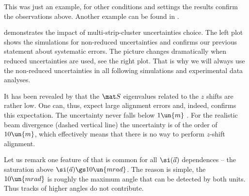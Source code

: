 This was just an example, for other conditions and settings the results confirm the observations above. Another example can be found in .


 demonstrates the impact of multi-strip-cluster uncertainties choice. The left plot shows the simulations for non-reduced uncertainties and confirms our previous statement about systematic errors. The picture changes dramatically when reduced uncertainties are used, see the right plot.
That is why we will always use the non-reduced uncertainties in all following simulations and experimental data analyses.


It has been revealed by  that the $\mat S$ eigenvalues related to the $z$ shifts are rather low. One can, thus, expect large alignment errors and, indeed,  confirms this expectation. The uncertainty never falls below $1\un{m}$ . For the realistic beam divergence (dashed vertical line) the uncertainty is of the order of $10\un{m}$, which effectively means that there is no way to perform $z$-shift alignment.

Let us remark one feature of  that is common for all $\si(\vec a)$ dependences -- the saturation above $\si(\vec a) \gs 10\un{mrad}$. The reason is simple, the $10\un{mrad}$ is roughly the maximum angle that can be detected by both units. Thus tracks of higher angles do not contribute.


